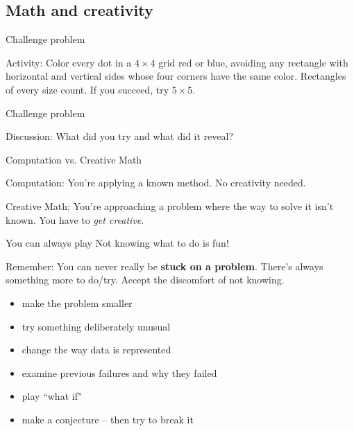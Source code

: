 \documentclass{beamer}
\begin{document}
\subsection{Math and creativity}

\begin{frame}{Challenge problem}
  \begin{block}{Activity:}
    Color every dot in a \(4\times4\) grid red or blue, avoiding any rectangle with horizontal and vertical sides whose four corners have the same color. Rectangles of every size count.  If you succeed, try \(5\times5\).
  \end{block}
\end{frame}

\begin{frame}{Challenge problem}
  \begin{block}{Discussion:}
    What did you try and what did it reveal?
  \end{block}
\end{frame}

\begin{frame}{Computation vs. Creative Math}
\pause
  \begin{block}{Computation:}
    You're applying a known method.  No creativity needed.
  \end{block}
\pause
  \begin{block}{Creative Math:}
    You're approaching a problem where the way to solve it isn't known.  You have to \textit{get creative}.
  \end{block}
\end{frame}

\begin{frame}{You can always play}
\pause
  Not knowing what to do {\color{red} is fun}!
\pause
  \begin{block}{Remember:}
    You can never really be \textbf{stuck on a problem}.  There's always something more to do/try.
\pause
    Accept the discomfort of not knowing.
  \end{block}
  \begin{itemize}
\pause
    \item make the problem smaller
\pause
    \item try something deliberately unusual
\pause
    \item change the way data is represented
\pause
    \item examine previous failures and why they failed
\pause
    \item play ``what if"
\pause
    \item make a conjecture -- then try to break it
  \end{itemize}
\end{frame}
\end{document}
